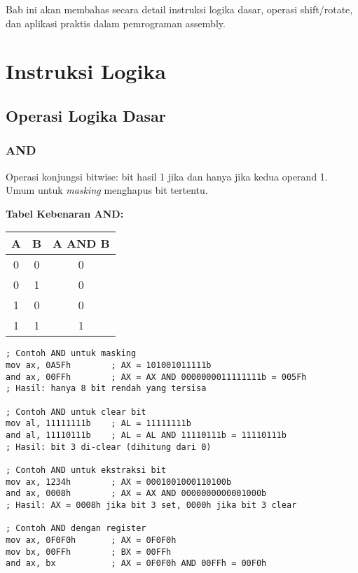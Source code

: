 \documentclass[../main.tex]{subfiles}
\begin{document}
        Bab ini akan membahas secara detail instruksi logika dasar, operasi shift/rotate, dan aplikasi praktis dalam pemrograman assembly.

    \section{Instruksi Logika}
        \subsection{Operasi Logika Dasar}
            \subsubsection{AND}
Operasi konjungsi bitwise: bit hasil 1 jika dan hanya jika kedua operand 1. Umum untuk \textit{masking} menghapus bit tertentu.

\textbf{Tabel Kebenaran AND:}
\begin{center}
    \begin{tabular}{|c|c|c|}
        \hline
        A & B & A AND B \\
        \hline
        0 & 0 & 0 \\
        0 & 1 & 0 \\
        1 & 0 & 0 \\
        1 & 1 & 1 \\
        \hline
    \end{tabular}
\end{center}

\begin{lstlisting}[language={[x86masm]Assembler}, caption=Instruksi AND, label={lst:and-examples}]
; Contoh AND untuk masking
mov ax, 0A5Fh        ; AX = 101001011111b
and ax, 00FFh        ; AX = AX AND 0000000011111111b = 005Fh
; Hasil: hanya 8 bit rendah yang tersisa

; Contoh AND untuk clear bit
mov al, 11111111b    ; AL = 11111111b
and al, 11110111b    ; AL = AL AND 11110111b = 11110111b
; Hasil: bit 3 di-clear (dihitung dari 0)

; Contoh AND untuk ekstraksi bit
mov ax, 1234h        ; AX = 0001001000110100b
and ax, 0008h        ; AX = AX AND 0000000000001000b
; Hasil: AX = 0008h jika bit 3 set, 0000h jika bit 3 clear

; Contoh AND dengan register
mov ax, 0F0F0h       ; AX = 0F0F0h
mov bx, 00FFh        ; BX = 00FFh
and ax, bx           ; AX = 0F0F0h AND 00FFh = 00F0h
\end{lstlisting}
\end{document}
